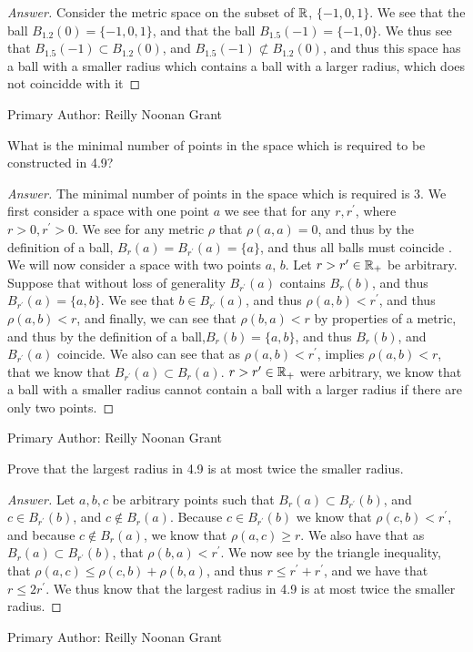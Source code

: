 \begin{proof}[Answer]
  Consider the metric space on the subset of $\mathbb{R}$, $\{-1,0,1\}$. We
  see that the ball $B_{1.2}(0) = \{-1,0,1\}$, and that the ball 
  $B_{1.5}(-1)=\{-1,0\}$. We thus see that $B_{1.5}(-1) \subset
  B_{1.2}(0)$, and $B_{1.5}(-1) \not\subset B_{1.2}(0)$, and thus this
  space has a ball with a smaller radius which contains a ball with a
  larger radius, which does not coincidde with it
\end{proof}

Primary Author: Reilly Noonan Grant

\begin{minorEx}%
    What is the minimal number of points in the space which is required to be
    constructed in 4.9?
\end{minorEx}


\begin{proof}[Answer]
  The minimal number of points in the space which is required is
  $3$. We first consider a space with one point $a$ we see that for
  any $r,r^\prime$, where $r > 0,r^\prime > 0$. We see for any metric
  $\rho$ that $\rho(a,a)=0$, and thus by the
  definition of a ball, $B_r(a)= B_{r^\prime}(a)=\{a\}$, and thus all
  balls must coincide . We will now consider a space with two
  points $a$, $b$. Let $r>r^\prime\in \mathbb{R}_+$ be arbitrary. Suppose
  that without loss of generality $B_{r^\prime}(a)$ contains $B_{r}(b)$, and thus
  $B_{r^\prime}(a)=\{a,b\}$.
 We see that $b\in
  B_{r^\prime}(a)$, and thus $\rho(a,b)<r^\prime$, and thus
  $\rho(a,b)<r$, and finally, we can see that $\rho(b,a)<r$ by
  properties of a metric, and thus by the definition of a
  ball,$B_{r}(b)=\{a,b\}$, and thus $B_{r}(b)$, and $B_{r^\prime}(a)$
  coincide. We also can see that as
  $\rho(a,b)<r^\prime$, implies $\rho(a,b)<r$, that we know that
  $ B_{r^\prime}(a) \subset B_{r}(a)$. $r>r^\prime\in \mathbb{R}_+$ were
  arbitrary, we know that a ball with a smaller radius cannot contain
  a ball with a larger radius if there are only two points.
\end{proof}
Primary Author: Reilly Noonan Grant

\begin{minorEx}%
    Prove that the largest radius in 4.9 is at most twice the smaller radius.
\end{minorEx}

\begin{proof}[Answer]
  Let $a,b,c$ be arbitrary points such that $B_r(a) \subset B_{r^\prime}(b)$,
  and $c \in B_{r^\prime}(b)$, and $c \notin
  B_r(a)$. Because $c \in B_{r^\prime}(b)$ we know that 
  $\rho(c,b)<r^\prime$, and because
  $c \notin  B_r(a)$, we know that $\rho(a,c)\geq r$. We also have
  that as $B_r(a) \subset B_{r^\prime}(b)$, that
  $\rho(b,a)<r^\prime$. We now see by the triangle inequality, that 
  $\rho(a,c) \leq \rho(c,b)+ \rho(b,a)$, and thus 
  $r \leq r^\prime +r^\prime$, and we have that $r\leq 2r^\prime$. We
  thus know that the largest radius in 4.9 is at most twice the
  smaller radius.
\end{proof}

Primary Author: Reilly Noonan Grant

